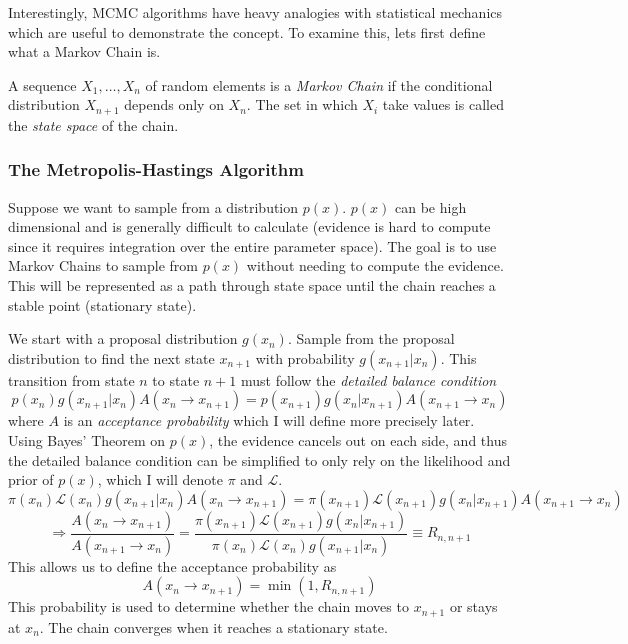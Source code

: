 Interestingly, MCMC algorithms have heavy analogies with statistical mechanics which are useful to demonstrate the concept. To examine this, lets first define what a Markov Chain is.
\begin{defn}
A sequence $X_1,\hdots,X_n$ of random elements is a \textit{Markov Chain} if the conditional distribution $X_{n+1}$ depends only on $X_n$. The set in which $X_i$ take values is called the \textit{state space} of the chain.
\end{defn}


\subsubsection{The Metropolis-Hastings Algorithm}
Suppose we want to sample from a distribution $p(x)$. $p(x)$ can be high dimensional and is generally difficult to calculate (evidence is hard to compute since it requires integration over the entire parameter space). 
The goal is to use Markov Chains to sample from $p(x)$ without needing to compute the evidence. 
This will be represented as a path through state space until the chain reaches a stable point (stationary state).

We start with a proposal distribution $g(x_n)$. 
Sample from the proposal distribution to find the next state $x_{n+1}$ with probability $g(x_{n+1}|x_n)$. 
This transition from state $n$ to state $n+1$ must follow the \textit{detailed balance condition}
\begin{equation}
	p(x_n) g(x_{n+1}|x_n) A(x_n \rightarrow x_{n+1}) = p(x_{n+1}) g(x_n|x_{n+1}) A(x_{n+1} \rightarrow x_{n})
\end{equation}
where $A$ is an \textit{acceptance probability} which I will define more precisely later. 
Using Bayes' Theorem on $p(x)$, the evidence cancels out on each side, 
and thus the detailed balance condition can be simplified to only rely on the likelihood and prior of $p(x)$, 
which I will denote $\pi$ and $\mathcal{L}$.
\begin{equation}
	\pi(x_n)\mathcal{L}(x_n) g(x_{n+1}|x_n) A(x_n \rightarrow x_{n+1}) = \pi(x_{n+1}) \mathcal{L}(x_{n+1}) g(x_{n}|x_{n+1}) A(x_{n+1}\rightarrow x_{n})
\end{equation}
\begin{equation}
	\Rightarrow \frac{A(x_n \rightarrow x_{n+1})}{A(x_{n+1}\rightarrow x_{n})} = \frac{\pi(x_{n+1}) \mathcal{L}(x_{n+1}) g(x_{n}|x_{n+1})}{\pi(x_n)\mathcal{L}(x_n) g(x_{n+1}|x_n)} \equiv R_{n,n+1}
\end{equation}
This allows us to define the acceptance probability as
\begin{equation}
	A(x_n \rightarrow x_{n+1}) = \min( 1, R_{n,n+1} )
\end{equation}
This probability is used to determine whether the chain moves to $x_{n+1}$ or stays at $x_n$. The chain converges when it reaches a stationary state.

